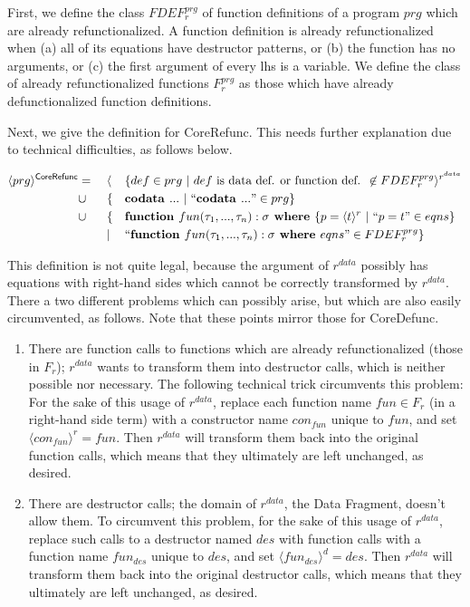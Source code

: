 \begin{algorithm}

First, we define the class $FDEF^{prg}_r$ of function definitions of a program $prg$ which are already refunctionalized. A function definition is already refunctionalized when (a) all of its equations have destructor patterns, or (b) the function has no arguments, or (c) the first argument of every lhs is a variable. We define the class of already refunctionalized functions $F^{prg}_r$ as those which have already defunctionalized function definitions.

Next, we give the definition for \textsf{CoreRefunc}. This needs further explanation due to technical difficulties, as follows below.

\begin{alignat*}{3}
\langle prg \rangle^{\textsf{CoreRefunc}} & = ~&& \langle && \{ def \in prg ~ | ~ def \textrm{ is data def. or function def. } \not\in FDEF^{prg}_r \rangle^{r^{data}} \\
& \cup && \{ && \textrm{\textbf{codata }} ... ~ | ~ `` \textrm{\textbf{codata }} ... " \in prg \} \\
& \cup && \{ && \textrm{\textbf{function }} fun(\tau_1, ..., \tau_n): \sigma \textrm{\textbf{ where }} \{ p = \langle t \rangle^r ~ | ~ ``p = t" \in eqns \} \\
& && | && `` \textrm{\textbf{function }} fun(\tau_1, ..., \tau_n): \sigma \textrm{\textbf{ where }} eqns " \in FDEF^{prg}_r \} 
\end{alignat*}

This definition is not quite legal, because the argument of $r^{data}$ possibly has equations with right-hand sides which cannot be correctly transformed by $r^{data}$. There a two different problems which can possibly arise, but which are also easily circumvented, as follows. Note that these points mirror those for \textsf{CoreDefunc}.
\begin{enumerate}
\item There are function calls to functions which are already refunctionalized (those in $F_r$); $r^{data}$ wants to transform them into destructor calls, which is neither possible nor necessary. The following technical trick circumvents this problem: For the sake of this usage of $r^{data}$, replace each function name $fun \in F_r$ (in a right-hand side term) with a constructor name $con_{fun}$ unique to $fun$, and set $\langle con_{fun} \rangle^r = fun$. Then $r^{data}$ will transform them back into the original function calls, which means that they ultimately are left unchanged, as desired.
\item There are destructor calls; the domain of $r^{data}$, the Data Fragment, doesn't allow them. To circumvent this problem, for the sake of this usage of $r^{data}$, replace such calls to a destructor named $des$ with function calls with a function name $fun_{des}$ unique to $des$, and set $\langle fun_{des} \rangle^d = des$. Then $r^{data}$ will transform them back into the original destructor calls, which means that they ultimately are left unchanged, as desired.
\end{enumerate}


\end{algorithm}
